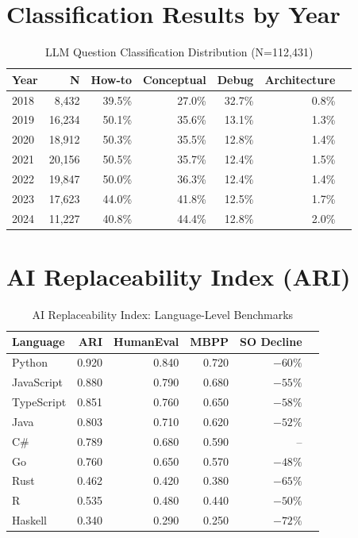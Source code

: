 \documentclass[11pt,a4paper]{article}
\begin{document}
\section{Classification Results by Year}
\label{app:classification}

\begin{table}[H]
\centering
\caption{LLM Question Classification Distribution (N=112,431)}
\begin{tabular}{lrrrrrr}
\toprule
\textbf{Year} & \textbf{N} & \textbf{How-to} & \textbf{Conceptual} & \textbf{Debug} & \textbf{Architecture} \\
\midrule
2018 & 8,432 & 39.5\% & 27.0\% & 32.7\% & 0.8\% \\
2019 & 16,234 & 50.1\% & 35.6\% & 13.1\% & 1.3\% \\
2020 & 18,912 & 50.3\% & 35.5\% & 12.8\% & 1.4\% \\
2021 & 20,156 & 50.5\% & 35.7\% & 12.4\% & 1.5\% \\
2022 & 19,847 & 50.0\% & 36.3\% & 12.4\% & 1.4\% \\
2023 & 17,623 & 44.0\% & 41.8\% & 12.5\% & 1.7\% \\
2024 & 11,227 & 40.8\% & 44.4\% & 12.8\% & 2.0\% \\
\bottomrule
\end{tabular}
\end{table}

\section{AI Replaceability Index (ARI)}
\label{app:ari}

\begin{table}[H]
\centering
\caption{AI Replaceability Index: Language-Level Benchmarks}
\begin{tabular}{lrrrrr}
\toprule
\textbf{Language} & \textbf{ARI} & \textbf{HumanEval} & \textbf{MBPP} & \textbf{SO Decline} \\
\midrule
Python & 0.920 & 0.840 & 0.720 & $-60\%$ \\
JavaScript & 0.880 & 0.790 & 0.680 & $-55\%$ \\
TypeScript & 0.851 & 0.760 & 0.650 & $-58\%$ \\
Java & 0.803 & 0.710 & 0.620 & $-52\%$ \\
C\# & 0.789 & 0.680 & 0.590 & -- \\
Go & 0.760 & 0.650 & 0.570 & $-48\%$ \\
Rust & 0.462 & 0.420 & 0.380 & $-65\%$ \\
R & 0.535 & 0.480 & 0.440 & $-50\%$ \\
Haskell & 0.340 & 0.290 & 0.250 & $-72\%$ \\
\bottomrule
\end{tabular}
\end{table}
\end{document}
